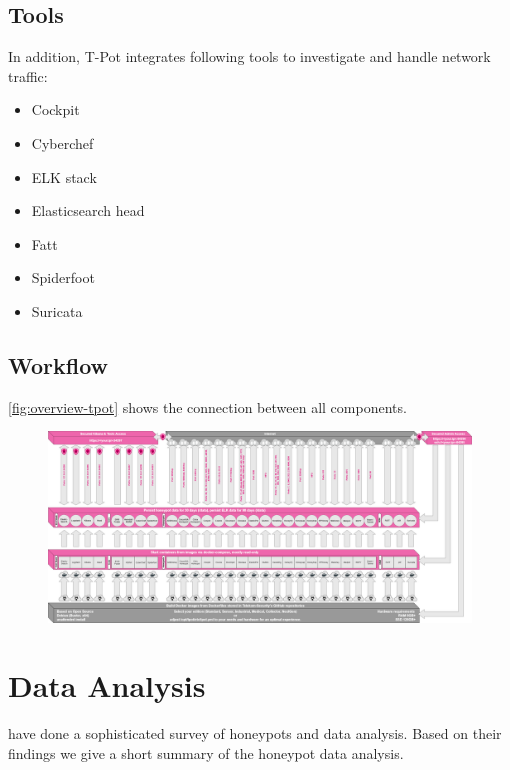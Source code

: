 \subsection{Tools}

In addition, T-Pot integrates following tools to investigate and handle network traffic:

\begin{itemize}
    \item Cockpit
    \item Cyberchef
    \item ELK stack
    \item Elasticsearch head
    \item Fatt
    \item Spiderfoot
    \item Suricata
\end{itemize}

\subsection{Workflow}

\autoref{fig:overview-tpot} shows the connection between all components.

\begin{figure}
    \centering
    \includegraphics[width=\textwidth]{figures/architecture.png}
    \caption{}
    \label{fig:overview-tpot}
\end{figure}

\section{Data Analysis}

\citet{NawrockiWSKS2016} have done a sophisticated survey of honeypots and data analysis.
Based on their findings we give a short summary of the honeypot data analysis.

